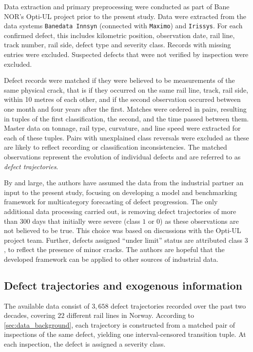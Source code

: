 Data extraction and primary preprocessing were conducted as part of Bane NOR's Opti-UL project prior to the present study. Data were extracted from the data systems \texttt{Banedata Innsyn} (connected with \texttt{Maximo}) and \texttt{Irissys}. For each confirmed defect, this includes kilometric position, observation date, rail line, track number, rail side, defect type and severity class. Records with missing entries were excluded. Suspected defects that were not verified by inspection were excluded.

Defect records were matched if they were believed to be measurements of the same physical crack, that is if they occurred on the same rail line, track, rail side, within 10 metres of each other, and if the second observation occurred between one month and four years after the first. Matches were ordered in pairs, resulting in tuples of the first classification, the second, and the time passed between them. Master data on tonnage, rail type, curvature, and line speed were extracted for each of these tuples. Pairs with unexplained class reversals were excluded as these are likely to reflect recording or classification inconsistencies. The matched observations represent the evolution of individual defects and are referred to as \textit{defect trajectories}.


By and large, the authors have assumed the data from the industrial partner an input to the present study, focusing on developing a model and benchmarking framework for multicategory forecasting of defect progression. The only additional data processing carried out, is removing defect trajectories of more than 300 days that initially were severe (class $1$ or $0$) as these observations are not believed to be true. This choice was based on discussions with the Opti-UL project team. Further, defects assigned ``under limit'' status are attributed class $3$, to reflect the presence of minor cracks.
The authors are hopeful that the developed framework can be applied to other sources of industrial data.

\subsection{Defect trajectories and exogenous information}\label{sec:defect_trajectories}
The available data consist of $3,658$ defect trajectories recorded over the past two decades, covering $22$ different rail lines in Norway. According to \cref{sec:data_background}, each trajectory is constructed from a matched pair of inspections of the same defect, yielding one interval-censored transition tuple. At each inspection, the defect is assigned a severity class.


